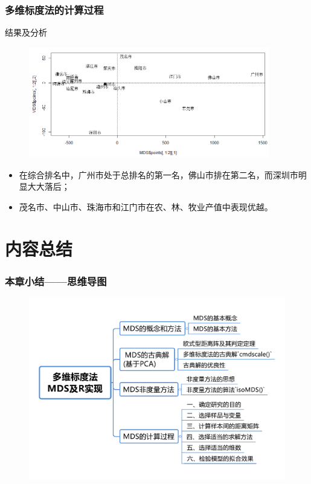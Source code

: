 \documentclass[UTF8, compress]{ctexbeamer}
\begin{document}
	
	\begin{frame}
		\frametitle{\heiti 多维标度法的计算过程}
		
		
		{\Large 结果及分析}
		
		\pause

		\begin{figure}
			\centering
			\includegraphics[width=10.5cm]{figures/6}
		\end{figure}
		
		\pause
		
		\begin{itemize}
			\item<3-> 在综合排名中，广州市处于总排名的第一名，佛山市排在第二名，而深圳市明显大大落后；
			
			\item<4-> 茂名市、中山市、珠海市和江门市在农、林、牧业产值中表现优越。
		\end{itemize}
		
	\end{frame}
	
\section{\heiti 内容总结}
	
	\begin{frame}
	\frametitle{\heiti 本章小结——思维导图}
	
		\pause
		
		\vspace*{-.4cm}
			
		\begin{figure}
			\centering
			\includegraphics[width=12cm]{figures/xmind}
			\label{fig:xmind}
		\end{figure}

	\end{frame}
	
\end{document}
